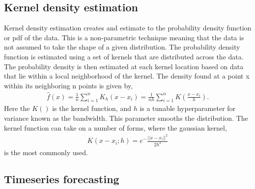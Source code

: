         
    
    \subsection{Kernel density estimation}\label{subsec:kde}
        Kernel density estimation creates and estimate to the probability density function or pdf of the data. This is a non-parametric technique meaning that the data is not assumed to take the shape of a given distribution. The probability density function is estimated using a set of kernels that are distributed across the data. The probability density is then estimated at each kernel location based on data that lie within a local neighborhood of the kernel. The density found at a point x within its neighboring n points is given by, 
        \begin{align}
            \hat{f}(x) = \frac{1}{n} \sum_{i=1}^n K_h(x-x_i)  = \frac{1}{nh} \sum_{i=1}^n K(\frac{x-x_i}{h}).
        \end{align}
        Here the $K()$ is the kernel function, and $h$ is a tunable hyperparameter for variance known as the bandwidth. This parameter smooths the distribution. The kernel function can take on a number of forms, where the gaussian kernel,
        \begin{align}
            K(x-x_i;h) = e^-\frac{||x-x_i||^2}{2h^2}
        \end{align}
        is the most commonly used. 
        
        
        
    \subsection{Timeseries forecasting}
    
